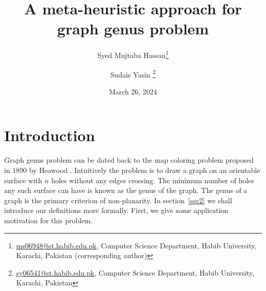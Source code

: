 \documentclass{article}
\newcommand{\Prob}[1]{\ensuremath{\text{\textsc{#1}}}}
\begin{document}
\title{A meta-heuristic approach for graph genus problem}
\author{Syed Mujtaba Hassan\footnote{\url{ms06948@st.habib.edu.pk}, Computer Science Department, Habib University, Karachi, Pakistan (corresponding author)} \and Sudais Yasin \footnote{\url{sy06541@st.habib.edu.pk}, Computer Science Department, Habib University, Karachi, Pakistan}}
\date{March 26, 2024}
\maketitle





\renewcommand\thefootnote{}


\renewcommand\thefootnote{\fnsymbol{footnote}}
\setcounter{footnote}{1}
\section{Introduction}\label{sec1}
    Graph genus problem can be dated back to the map coloring problem proposed in 1890 by Heawood \cite{Liangxia23}.
    Intuitively the problem is to draw a graph on an orientable surface with $n$ holes without any edges crossing. 
    The minimum number of holes any such surface can have is known as the genus of the graph. The genus of a graph is the primary criterion of non-planarity.
    In section~\ref{sec2} we shall introduce our definitions more formally. First, we give some application motivation for this problem. 
\end{document}
